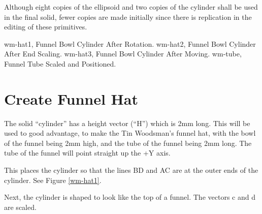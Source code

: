 Although eight copies of the ellipsoid and two copies of the cylinder
shall be used in the final solid, fewer copies are made initially since there
is replication in the editing of these primitives.


\mfig wm-hat1, Funnel Bowl Cylinder After Rotation.
\mfig wm-hat2, Funnel Bowl Cylinder After End Scaling.
\mfig wm-hat3, Funnel Bowl Cylinder After Moving.
\mfig wm-tube, Funnel Tube Scaled and Positioned.
\section{Create Funnel Hat}

The solid ``cylinder'' has a height vector (``H'') which is 2mm
long.
This will be used to good advantage, to make the Tin Woodsman's
funnel hat, with the bowl of the funnel being 2mm high,
and the tube of the funnel being 2mm long.
The tube of the funnel will point straight up the +Y axis.


This places the cylinder so that the lines BD and AC are at the outer
ends of the cylinder.  See Figure \ref{wm-hat1}.

Next, the cylinder is shaped to look like the top of a funnel.
The vectors c and d are scaled.


